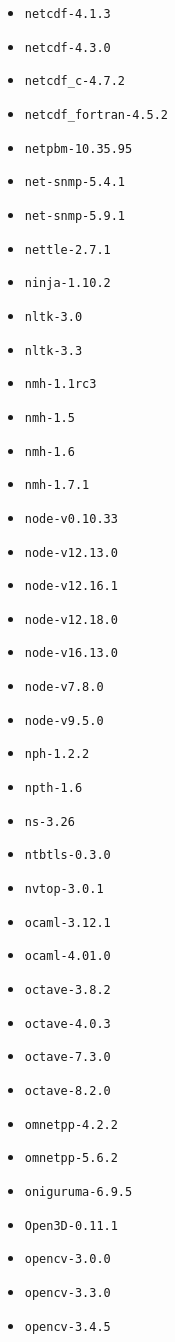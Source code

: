 \begin{multicols}{3}
\begin{itemize}
\item \verb|netcdf-4.1.3|
\item \verb|netcdf-4.3.0|
\item \verb|netcdf_c-4.7.2|
\item \verb|netcdf_fortran-4.5.2|
\item \verb|netpbm-10.35.95|
\item \verb|net-snmp-5.4.1|
\item \verb|net-snmp-5.9.1|
\item \verb|nettle-2.7.1|
\item \verb|ninja-1.10.2|
\item \verb|nltk-3.0|
\item \verb|nltk-3.3|
\item \verb|nmh-1.1rc3|
\item \verb|nmh-1.5|
\item \verb|nmh-1.6|
\item \verb|nmh-1.7.1|
\item \verb|node-v0.10.33|
\item \verb|node-v12.13.0|
\item \verb|node-v12.16.1|
\item \verb|node-v12.18.0|
\item \verb|node-v16.13.0|
\item \verb|node-v7.8.0|
\item \verb|node-v9.5.0|
\item \verb|nph-1.2.2|
\item \verb|npth-1.6|
\item \verb|ns-3.26|
\item \verb|ntbtls-0.3.0|
\item \verb|nvtop-3.0.1|
\item \verb|ocaml-3.12.1|
\item \verb|ocaml-4.01.0|
\item \verb|octave-3.8.2|
\item \verb|octave-4.0.3|
\item \verb|octave-7.3.0|
\item \verb|octave-8.2.0|
\item \verb|omnetpp-4.2.2|
\item \verb|omnetpp-5.6.2|
\item \verb|oniguruma-6.9.5|
\item \verb|Open3D-0.11.1|
\item \verb|opencv-3.0.0|
\item \verb|opencv-3.3.0|
\item \verb|opencv-3.4.5|

\end{itemize}
\end{multicols}
